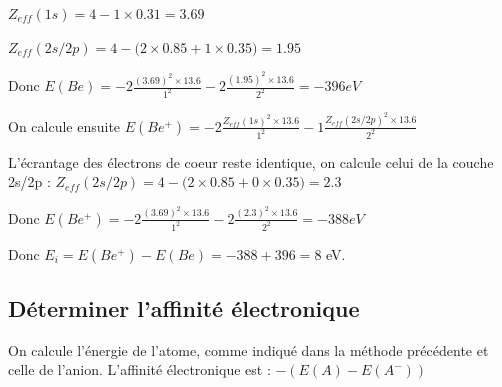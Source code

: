 \documentclass[french]{yLectureNote}
\begin{document}
$Z_{eff}(1s) = 4-1\times 0.31 = 3.69$

$Z_{eff}(2s/2p) = 4-(2\times 0.85 + 1\times 0.35$$) = 1.95$

Donc $E(Be) = -2\frac{(3.69)^2\times 13.6}{1^2} - 2\frac{(1.95)^2\times 13.6}{2^2} = -396 eV$

On calcule ensuite $E(Be^+) = -2\frac{Z_{eff}(1s)^2\times 13.6}{1^2} - 1\frac{Z_{eff}(2s/2p)^2\times 13.6}{2^2}$

L'écrantage des électrons de coeur reste identique, on calcule celui de la couche 2s/2p : $Z_{eff}(2s/2p) = 4-(2\times 0.85 + 0\times 0.35$$) = 2.3$

Donc $E(Be^+) = -2\frac{(3.69)^2\times 13.6}{1^2} - 2\frac{(2.3)^2\times 13.6}{2^2} = -388 eV$

Donc $E_i = E(Be^+)-E(Be) = -388+396 = 8$ eV.
\subsection{Déterminer l'affinité électronique}

On calcule l'énergie de l'atome, comme indiqué dans la méthode précédente et celle de l'anion. L'affinité électronique est : $-(E(A)-E(A^-))$
\end{document}
